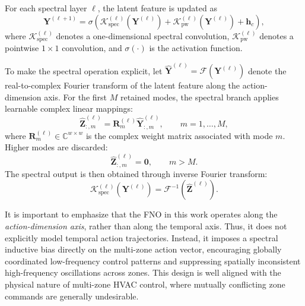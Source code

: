 \documentclass[lettersize,journal]{IEEEtran}
\theoremstyle{nonumberplain}     \theoremheaderfont{\bfseries\itshape}     \theorembodyfont{\normalfont}     \theoremseparator{:}     \theoremsymbol{\ensuremath{\blacksquare}}     \newtheorem{proof}{Proof}
\theoremstyle{plain}     \theoremheaderfont{\bfseries\itshape}     \theorembodyfont{\normalfont}     \theoremseparator{:}     \theoremsymbol{\ensuremath{\blacksquare}}     \newtheorem{remark}{Remark}
\begin{document}
For each spectral layer $\ell$, the latent feature is updated as
\begin{equation}
\mathbf{Y}^{(\ell+1)}
=
\sigma
\left(
\mathcal{K}_{\mathrm{spec}}^{(\ell)}(\mathbf{Y}^{(\ell)})
+
\mathcal{K}_{\mathrm{pw}}^{(\ell)}(\mathbf{Y}^{(\ell)})
+
\mathbf{h}_c
\right),
\label{eq:spectral_layer}
\end{equation}
where $\mathcal{K}_{\mathrm{spec}}^{(\ell)}$ denotes a one-dimensional spectral convolution, $\mathcal{K}_{\mathrm{pw}}^{(\ell)}$ denotes a pointwise $1\times 1$ convolution, and $\sigma(\cdot)$ is the activation function.

To make the spectral operation explicit, let $\widehat{\mathbf{Y}}^{(\ell)}=\mathcal{F}(\mathbf{Y}^{(\ell)})$ denote the real-to-complex Fourier transform of the latent feature along the action-dimension axis. For the first $M$ retained modes, the spectral branch applies learnable complex linear mappings:
\begin{equation}
\widehat{\mathbf{Z}}^{(\ell)}_{:,m}
=
\mathbf{R}^{(\ell)}_{m}\widehat{\mathbf{Y}}^{(\ell)}_{:,m},
\qquad
m=1,\dots,M,
\label{eq:spectral_modes}
\end{equation}
where $\mathbf{R}^{(\ell)}_{m} \in \mathbb{C}^{w\times w}$ is the complex weight matrix associated with mode $m$. Higher modes are discarded:
\begin{equation}
\widehat{\mathbf{Z}}^{(\ell)}_{:,m}=\mathbf{0},
\qquad
m>M.
\label{eq:mode_truncation}
\end{equation}
The spectral output is then obtained through inverse Fourier transform:
\begin{equation}
\mathcal{K}_{\mathrm{spec}}^{(\ell)}(\mathbf{Y}^{(\ell)})
=
\mathcal{F}^{-1}\left(\widehat{\mathbf{Z}}^{(\ell)}\right).
\label{eq:spec_conv}
\end{equation}

It is important to emphasize that the FNO in this work operates along the \emph{action-dimension axis}, rather than along the temporal axis. Thus, it does not explicitly model temporal action trajectories. Instead, it imposes a spectral inductive bias directly on the multi-zone action vector, encouraging globally coordinated low-frequency control patterns and suppressing spatially inconsistent high-frequency oscillations across zones. This design is well aligned with the physical nature of multi-zone HVAC control, where mutually conflicting zone commands are generally undesirable.
\end{document}
